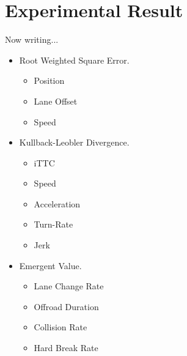 \chapter{Experimental Result}
\label{chapter:Experimental_Result}

Now writing...

\begin{itemize}
\item Root Weighted Square Error.
\begin{itemize}
\item Position
\item Lane Offset
\item Speed
\end{itemize}
\item Kullback-Leobler Divergence.
\begin{itemize}
\item iTTC
\item Speed
\item Acceleration
\item Turn-Rate
\item Jerk
\end{itemize}
\item Emergent Value.
\begin{itemize}
\item Lane Change Rate
\item Offroad Duration
\item Collision Rate
\item Hard Break Rate
\end{itemize}
\end{itemize}
